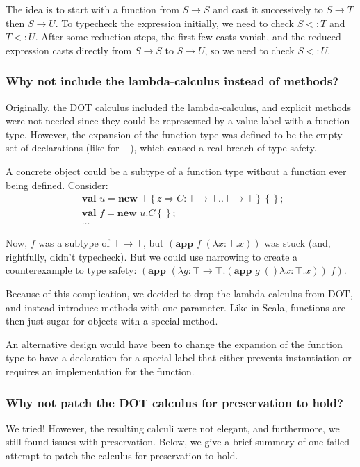 \documentclass[9pt]{sigplanconf}
\newcommand{\sub}{<:}
\newcommand{\tfun}{\rightarrow}
\newcommand{\refine}[2]{\left\{#1 \Rightarrow #2 \right\}}
\newcommand{\ldefs}[1]{\left\{#1\right\}}
\newcommand{\abs}[3]{\lambda #1\!:\!#2.#3}
\newcommand{\mlnew}[3]{\textbf{val }#1 = \textbf{new }#2 ;\;\\&#3}
\newcommand{\Ldecl}[3]{#1 : #2..#3}%
\newcommand{\Top}{\top}%
\newcommand{\app}[2]{(\textbf{app }#1\;#2)}
\begin{document}
The idea is to start with a function from $S \tfun S$ and cast it
successively to $S \tfun T$ then $S \tfun U$. To typecheck the
expression initially, we need to check $S \sub T$ and $T \sub
U$. After some reduction steps, the first few casts vanish, and the
reduced expression casts directly from $S \tfun S$ to $S \tfun U$, so
we need to check $S \sub U$.

\subsubsection{Why not include the lambda-calculus instead of methods?}

Originally, the DOT calculus included the lambda-calculus, and
explicit methods were not needed since they could be represented by a
value label with a function type. However, the expansion of the
function type was defined to be the empty set of declarations (like
for $\Top$), which caused a real breach of type-safety.

A concrete object could be a subtype of a function type without a
function ever being defined. Consider:
\begin{align*}
&\mlnew u {\Top \refine z {\Ldecl C {\Top \tfun \Top} {\Top \tfun \Top}} \ldefs{}} {
\mlnew f {u.C \ldefs{}} {
\ldots
}}
\end{align*}

Now, $f$ was a subtype of $\Top \tfun \Top$, but $\app f {(\abs x \Top
  x)}$ was stuck (and, rightfully, didn't typecheck). But we could use
narrowing to create a counterexample to type safety: $\app {(\abs g
  {\Top \tfun \Top} {\app g (\abs x \Top x)})} f$.

Because of this complication, we decided to drop the lambda-calculus
from DOT, and instead introduce methods with one parameter. Like in
Scala, functions are then just sugar for objects with a special
method.

An alternative design would have been to change the expansion of the
function type to have a declaration for a special label that either
prevents instantiation or requires an implementation for the
function.

\subsubsection{Why not patch the DOT calculus for preservation to hold?}\label{pres-patch}

We tried! However, the resulting calculi were not elegant, and
furthermore, we still found issues with preservation. Below, we give a
brief summary of one failed attempt to patch the calculus for
preservation to hold.
\end{document}
